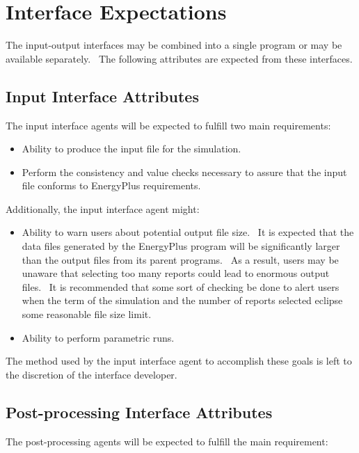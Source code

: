 \section{Interface Expectations}\label{interface-expectations}

The input-output interfaces may be combined into a single program or may be available separately.~ The following attributes are expected from these interfaces.

\subsection{Input Interface Attributes}\label{input-interface-attributes}

The input interface agents will be expected to fulfill two main requirements:

\begin{itemize}
\item
  Ability to produce the input file for the simulation.
\item
  Perform the consistency and value checks necessary to assure that the input file conforms to EnergyPlus requirements.
\end{itemize}

Additionally, the input interface agent might:

\begin{itemize}
\item
  Ability to warn users about potential output file size.~ It is expected that the data files generated by the EnergyPlus program will be significantly larger than the output files from its parent programs.~ As a result, users may be unaware that selecting too many reports could lead to enormous output files.~ It is recommended that some sort of checking be done to alert users when the term of the simulation and the number of reports selected eclipse some reasonable file size limit.
\item
  Ability to perform parametric runs.
\end{itemize}

The method used by the input interface agent to accomplish these goals is left to the discretion of the interface developer.

\subsection{Post-processing Interface Attributes}\label{post-processing-interface-attributes}

The post-processing agents will be expected to fulfill the main requirement:

